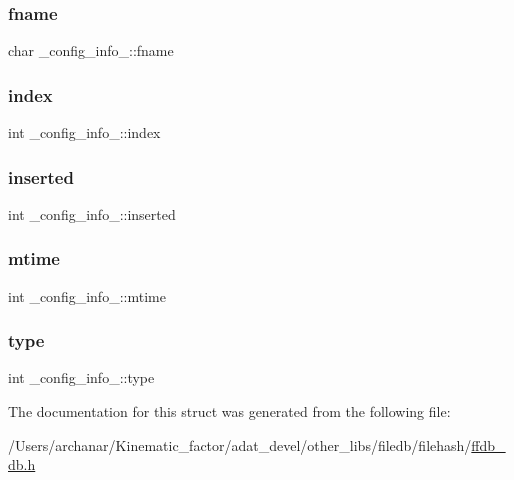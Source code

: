 \mbox{\label{struct__config__info___ab1ec0b2787d132f27ac64dde75f6c3ae}} 
\subsubsection{\texorpdfstring{fname}{fname}}
{\footnotesize\ttfamily char \+\_\+config\+\_\+info\+\_\+\+::fname}

\mbox{\label{struct__config__info___a78aa940c1f0397a3f7acfd7b2ed3a196}} 
\subsubsection{\texorpdfstring{index}{index}}
{\footnotesize\ttfamily int \+\_\+config\+\_\+info\+\_\+\+::index}

\mbox{\label{struct__config__info___a1b87a01f516bd83ef533699c6ac16c92}} 
\subsubsection{\texorpdfstring{inserted}{inserted}}
{\footnotesize\ttfamily int \+\_\+config\+\_\+info\+\_\+\+::inserted}

\mbox{\label{struct__config__info___a57f55946a7e2b18f510873fac9b24a56}} 
\subsubsection{\texorpdfstring{mtime}{mtime}}
{\footnotesize\ttfamily int \+\_\+config\+\_\+info\+\_\+\+::mtime}

\mbox{\label{struct__config__info___af58415103a98083a811c0930139f13dc}} 
\subsubsection{\texorpdfstring{type}{type}}
{\footnotesize\ttfamily int \+\_\+config\+\_\+info\+\_\+\+::type}



The documentation for this struct was generated from the following file\+:\begin{DoxyCompactItemize}
\item 
/\+Users/archanar/\+Kinematic\+\_\+factor/adat\+\_\+devel/other\+\_\+libs/filedb/filehash/\mbox{\hyperlink{other__libs_2filedb_2filehash_2ffdb__db_8h}{ffdb\+\_\+db.\+h}}\end{DoxyCompactItemize}
